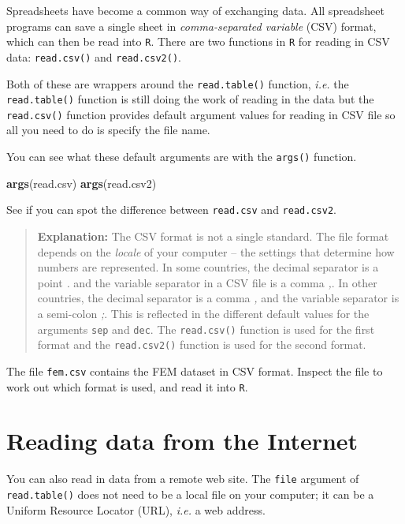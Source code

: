 \documentclass[
]{book}
\newenvironment{Shaded}{\begin{snugshade}}{\end{snugshade}}
\newcommand{\FunctionTok}[1]{\textcolor[rgb]{0.13,0.29,0.53}{\textbf{#1}}}
\newcommand{\NormalTok}[1]{#1}
\begin{document}
Spreadsheets have become a common way of exchanging data. All
spreadsheet programs can save a single sheet in \emph{comma-separated
variable} (CSV) format, which can then be read into \texttt{R}. There
are two functions in \texttt{R} for reading in CSV data:
\texttt{read.csv()} and \texttt{read.csv2()}.

Both of these are wrappers around the \texttt{read.table()} function,
\emph{i.e.} the \texttt{read.table()} function is still doing the work
of reading in the data but the \texttt{read.csv()} function provides
default argument values for reading in CSV file so all you need to
do is specify the file name.

You can see what these default arguments are with the \texttt{args()}
function.

\begin{Shaded}
\begin{Highlighting}[]
\FunctionTok{args}\NormalTok{(read.csv)}
\FunctionTok{args}\NormalTok{(read.csv2)}
\end{Highlighting}
\end{Shaded}

See if you can spot the difference between \texttt{read.csv} and
\texttt{read.csv2}.

\begin{quote}
\textbf{Explanation:} The CSV format is not a single standard. The
file format depends on the \emph{locale} of your computer -- the
settings that determine how numbers are represented. In some
countries, the decimal separator is a point \emph{.} and the variable
separator in a CSV file is a comma \emph{,}. In other countries, the
decimal separator is a comma \emph{,} and the variable separator is a
semi-colon \emph{;}. This is reflected in the different default values
for the arguments \texttt{sep} and \texttt{dec}. The
\texttt{read.csv()} function is used for the first format and the
\texttt{read.csv2()} function is used for the second format.
\end{quote}

The file \texttt{fem.csv} contains the FEM dataset in CSV format.
Inspect the file to work out which format is used, and read it into
\texttt{R}.

\section{Reading data from the Internet}\label{reading-data-from-the-internet}

You can also read in data from a remote web site. The \texttt{file}
argument of \texttt{read.table()} does not need to be a local file on
your computer; it can be a Uniform Resource Locator (URL), \emph{i.e.}
a web address.
\end{document}
